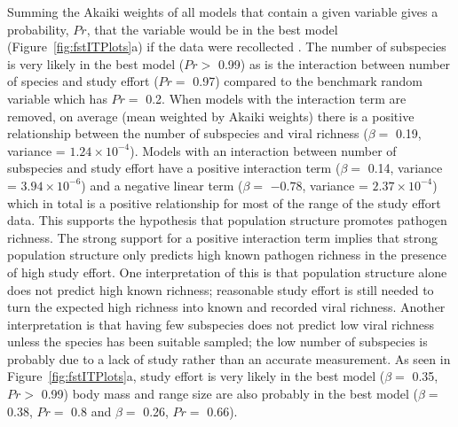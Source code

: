 
Summing the Akaiki weights of all models that contain a given variable gives a probability, $Pr$, that the variable would be in the best model (Figure~\ref{fig:fstITPlots}a) if the data were recollected \cite{whittingham2006we}.
The number of subspecies is very likely in the best model ($Pr > $ 0.99) as is the interaction between number of species and study effort ($Pr = $ 0.97) compared to the benchmark random variable which has $Pr = $ 0.2.
When models with the interaction term are removed, on average (mean weighted by Akaiki weights) there is a positive relationship between the number of subspecies and viral richness ($\beta = $ 0.19, variance = \ensuremath{1.24\times 10^{-4}}).
Models with an interaction between number of subspecies and study effort have a positive interaction term ($\beta = $ 0.14, variance = \ensuremath{3.94\times 10^{-6}}) and a negative linear term ($\beta = $ \ensuremath{-0.78}, variance = \ensuremath{2.37\times 10^{-4}}) which in total is a positive relationship for most of the range of the study effort data.
This supports the hypothesis that population structure promotes pathogen richness.
The strong support for a positive interaction term implies that strong population structure only predicts high known pathogen richness in the presence of high study effort.
One interpretation of this is that population structure alone does not predict high known richness; reasonable study effort is still needed to turn the expected high richness into known and recorded viral richness.
Another interpretation is that having few subspecies does not predict low viral richness unless the species has been suitable sampled; the low number of subspecies is probably due to a lack of study rather than an accurate measurement.
As seen in Figure~\ref{fig:fstITPlots}a, study effort is very likely in the best model ($\beta = $ 0.35, $Pr > $ 0.99) body mass and range size are also probably in the best model ($\beta = $ 0.38, $Pr = $ 0.8 and $\beta = $ 0.26, $Pr = $ 0.66).



